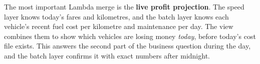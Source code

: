 The most important Lambda merge is the \textbf{live profit projection}. The speed layer knows today's fares
and kilometres, and the batch layer knows each vehicle's recent fuel cost per kilometre and maintenance per
day. The view  combines them to show which vehicles are losing money
\emph{today}, before today's cost file exists. This answers the second part of the business question during
the day, and the batch layer confirms it with exact numbers after midnight.
